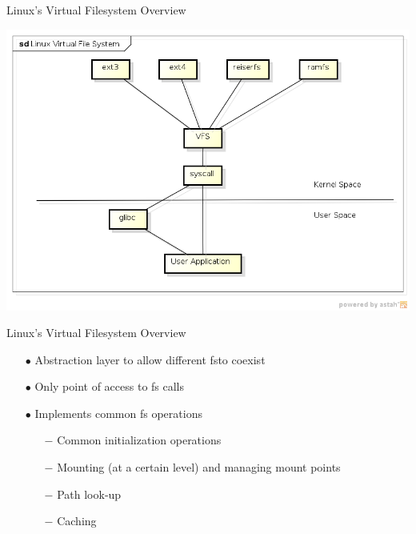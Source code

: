 \documentclass{beamer}
\begin{document}
\begin{frame}{Linux's Virtual Filesystem Overview}

	\includegraphics[scale=0.5]{img/vfs_overview.png}

\end{frame}

\begin{frame}{Linux's Virtual Filesystem Overview}

	\begin{itemize}[<+->]
	
		\item[$\bullet$]{Abstraction layer to allow different fs\footnotemark[1] to coexist}	
		\item[$\bullet$]{Only point of access to fs calls}
		\item[$\bullet$]{Implements common fs operations}
			\begin{itemize}
				\item[$-$]{Common initialization operations}
				\item[$-$]{Mounting (at a certain level) and managing mount points}
				\item[$-$]{Path look-up}
				\item[$-$]{Caching}
			\end{itemize}	
	\end{itemize}


\end{frame}
\end{document}
